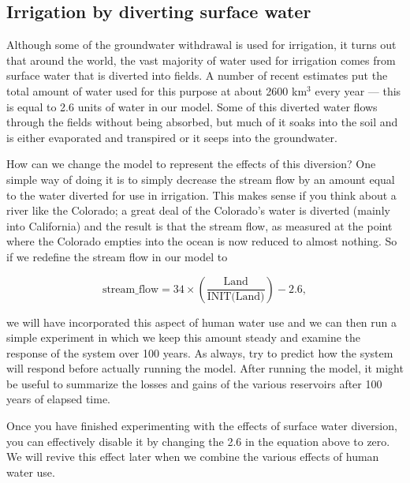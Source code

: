 \documentclass[11pt,letterpaper]{article}
\begin{document}
\subsection{Irrigation by diverting surface water}
Although some of the groundwater withdrawal is used for irrigation, it turns out that around the world, the vast majority of water used for irrigation comes from surface water that is diverted into fields. A number of recent estimates put the total amount of water used for this purpose at about 2600 km$^3$ every year --- this is equal to 2.6 units of water in our model. Some of this diverted water flows through the fields without being absorbed, but much of it soaks into the soil and is either evaporated and transpired or it seeps into the groundwater.

How can we change the model to represent the effects of this diversion? One simple way of doing it is to simply decrease the stream flow by an amount equal to the water diverted for use in irrigation. This makes sense if you think about a river like the Colorado; a great deal of the Colorado's water is diverted (mainly into California) and the result is that the stream flow, as measured at the point where the Colorado empties into the ocean is now reduced to almost nothing. So if we redefine the stream flow in our model to

$$\mbox{stream\_flow} = 34\times\left(\frac{\mbox{Land}}{\mbox{INIT(Land)}}\right)-2.6,$$

we will have incorporated this aspect of human water use and we can then run a simple experiment in which we keep this amount steady and examine the response of the system over 100 years. As always, try to predict how the system will respond before actually running the model. After running the model, it might be useful to summarize the losses and gains of the various reservoirs after 100 years of elapsed time.

Once you have finished experimenting with the effects of surface water diversion, you can effectively disable it by changing the 2.6 in the equation above to zero. We will revive this effect later when we combine the various effects of human water use.
\end{document}
